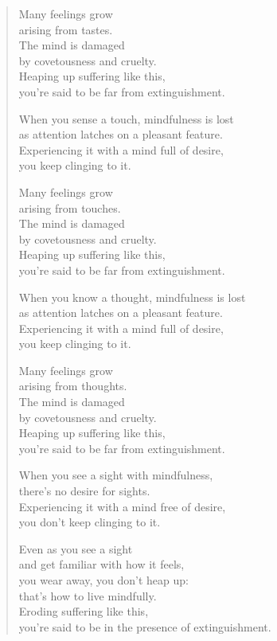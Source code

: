 \documentclass[12pt,openany]{book}%
\begin{document}
\begin{verse}
Many feelings grow \\
arising from tastes. \\
The mind is damaged \\
by covetousness and cruelty. \\
Heaping up suffering like this, \\
you’re said to be far from extinguishment. 

When you sense a touch, mindfulness is lost \\
as attention latches on a pleasant feature. \\
Experiencing it with a mind full of desire, \\
you keep clinging to it. 

Many feelings grow \\
arising from touches. \\
The mind is damaged \\
by covetousness and cruelty. \\
Heaping up suffering like this, \\
you’re said to be far from extinguishment. 

When you know a thought, mindfulness is lost \\
as attention latches on a pleasant feature. \\
Experiencing it with a mind full of desire, \\
you keep clinging to it. 

Many feelings grow \\
arising from thoughts. \\
The mind is damaged \\
by covetousness and cruelty. \\
Heaping up suffering like this, \\
you’re said to be far from extinguishment. 

When you see a sight with mindfulness, \\
there’s no desire for sights. \\
Experiencing it with a mind free of desire, \\
you don’t keep clinging to it. 

Even as you see a sight \\
and get familiar with how it feels, \\
you wear away, you don’t heap up: \\
that’s how to live mindfully. \\
Eroding suffering like this, \\
you’re said to be in the presence of extinguishment. 


\end{verse}
\end{document}
